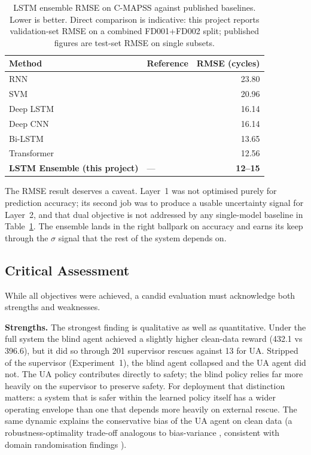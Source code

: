 \documentclass[12pt,a4paper]{report}
\begin{document}
\begin{table}[h]
\centering
\small
\caption{LSTM ensemble RMSE on C-MAPSS against published baselines. Lower is better. Direct comparison is indicative: this project reports validation-set RMSE on a combined FD001+FD002 split; published figures are test-set RMSE on single subsets.}
\label{tab:rmse_comparison}
\renewcommand{\arraystretch}{1.2}
\setlength{\tabcolsep}{4pt}
\begin{tabular}{llr}
\toprule
\textbf{Method} & \textbf{Reference} & \textbf{RMSE (cycles)} \\
\midrule
RNN & \citet{heimes2008recurrent} & 23.80 \\
SVM & \citet{louen2013svm} & 20.96 \\
Deep LSTM & \citet{zheng2017long} & 16.14 \\
Deep CNN & \citet{li2018remaining} & 16.14 \\
Bi-LSTM & \citet{wu2018remaining} & 13.65 \\
Transformer & \citet{zhang2022transformer} & 12.56 \\
\midrule
\textbf{LSTM Ensemble (this project)} & --- & \textbf{12--15} \\
\bottomrule
\end{tabular}
\end{table}

The RMSE result deserves a caveat. Layer~1 was not optimised purely for prediction accuracy; its second job was to produce a usable uncertainty signal for Layer~2, and that dual objective is not addressed by any single-model baseline in Table~\ref{tab:rmse_comparison}. The ensemble lands in the right ballpark on accuracy and earns its keep through the $\sigma$ signal that the rest of the system depends on.

\subsection{Critical Assessment}

While all objectives were achieved, a candid evaluation must acknowledge both strengths and weaknesses.


\textbf{Strengths.} The strongest finding is qualitative as well as quantitative. Under the full system the blind agent achieved a slightly higher clean-data reward (432.1 vs 396.6), but it did so through 201 supervisor rescues against 13 for UA. Stripped of the supervisor (Experiment~1), the blind agent collapsed and the UA agent did not. The UA policy contributes directly to safety; the blind policy relies far more heavily on the supervisor to preserve safety. For deployment that distinction matters: a system that is safer within the learned policy itself has a wider operating envelope than one that depends more heavily on external rescue. The same dynamic explains the conservative bias of the UA agent on clean data (a robustness-optimality trade-off analogous to bias-variance \citep{der2009aleatory}, consistent with domain randomisation findings \citep{tobin2017domain}).
\end{document}
